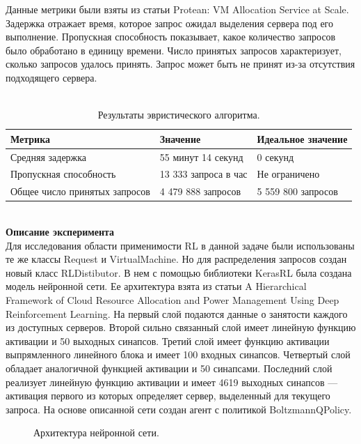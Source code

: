 \documentclass[draft]{article}
\begin{document}
Данные метрики были взяты из статьи Protean: VM Allocation Service at Scale\cite{litlink21}. Задержка отражает время, которое запрос ожидал выделения сервера под его выполнение. Пропускная способность показывает, какое количество запросов было обработано в единицу времени. Число принятых запросов характеризует, сколько запросов удалось принять. Запрос может быть не принят из-за отсутствия подходящего сервера.\\
~\\
\begin{table}[H]
\begin{center}
\begin{tabular}{ | l | l | l | }
\hline
Метрика & Значение & Идеальное значение\\ \hline
Средняя задержка & 55 минут 14 секунд & 0 секунд \\
Пропускная способность & 13 333 запроса в час & Не ограничено \\
Общее число принятых запросов & 4 479 888 запросов & 5 559 800 запросов \\
\hline
\end{tabular}
\caption{\label{tab:table-name}Результаты эвристического алгоритма.}
\end{center}
\end{table}
~\\
\textbf{Описание эксперимента}\\
Для исследования области применимости RL в данной задаче были использованы те же классы Request и VirtualMachine. Но для распределения запросов создан новый класс RLDistibutor. В нем с помощью библиотеки KerasRL была создана модель нейронной сети. Ее архитектура взята из статьи A Hierarchical Framework of Cloud Resource Allocation and Power Management Using Deep Reinforcement Learning\cite{litlink24}. На первый слой подаются данные о занятости каждого из доступных серверов. Второй сильно связанный слой имеет линейную функцию активации и 50 выходных синапсов. Третий слой имеет функцию активации выпрямленного линейного блока и имеет 100 входных синапсов. Четвертый слой обладает аналогичной функцией активации и 50 синапсами. Последний слой реализует линейную функцию активации и имеет 4619 выходных синапсов — активация первого из которых определяет сервер, выделенный для текущего запроса. На основе описанной сети создан агент с политикой BoltzmannQPolicy.\\
\begin{figure}[h!]
\caption{Архитектура нейронной сети.}
\label{ris:image}
\end{figure}\\
\end{document}
